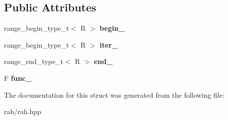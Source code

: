 \subsection*{Public Attributes}
\begin{DoxyCompactItemize}
\item 
\mbox{\label{struct_r_a_h___n_a_m_e_s_p_a_c_e_1_1view_1_1filter__iterator_a8a953a6dfd5a7d536749ea0545ac7528}} 
range\+\_\+begin\+\_\+type\+\_\+t$<$ R $>$ {\bfseries begin\+\_\+}
\item 
\mbox{\label{struct_r_a_h___n_a_m_e_s_p_a_c_e_1_1view_1_1filter__iterator_ac5b8112fa111a784e28ced304df2f1d9}} 
range\+\_\+begin\+\_\+type\+\_\+t$<$ R $>$ {\bfseries iter\+\_\+}
\item 
\mbox{\label{struct_r_a_h___n_a_m_e_s_p_a_c_e_1_1view_1_1filter__iterator_affa14e2b79bac2b7fa67a9b55094d9db}} 
range\+\_\+end\+\_\+type\+\_\+t$<$ R $>$ {\bfseries end\+\_\+}
\item 
\mbox{\label{struct_r_a_h___n_a_m_e_s_p_a_c_e_1_1view_1_1filter__iterator_a817c551a4fc6335a1a1de29ad84e39aa}} 
F {\bfseries func\+\_\+}
\end{DoxyCompactItemize}


The documentation for this struct was generated from the following file\+:\begin{DoxyCompactItemize}
\item 
rah/rah.\+hpp\end{DoxyCompactItemize}
